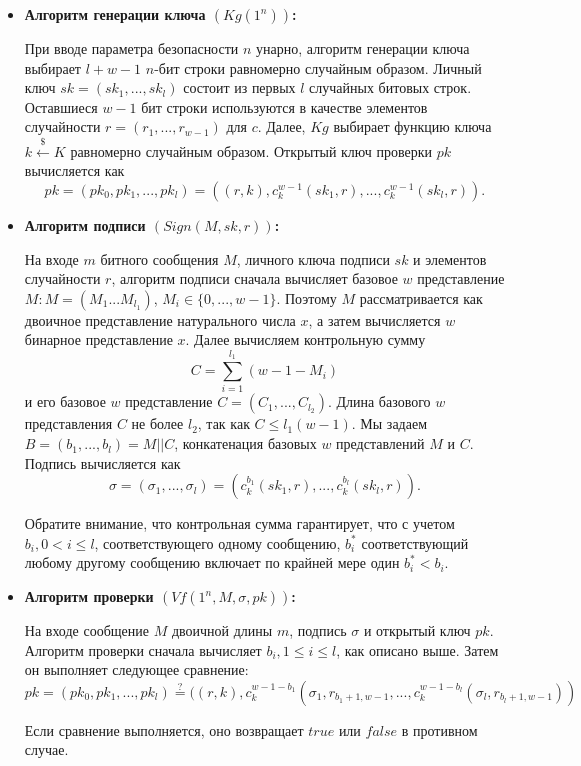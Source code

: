 \documentclass[a4paper, 14pt]{extarticle}
\begin{document}
\begin{itemize}
    \item \textbf{Алгоритм генерации ключа $(Kg(1^n))$:}

    При вводе параметра безопасности $n$ унарно, алгоритм генерации ключа выбирает $l + w - 1$ $n$-бит строки равномерно случайным образом. Личный ключ $sk = (sk_{1}, ..., sk_{l})$ состоит из первых $l$ случайных битовых строк. Оставшиеся $w - 1$ бит строки используются в качестве элементов случайности $r = (r_{1}, ..., r_{w - 1})$ для $c$. Далее, $Kg$ выбирает функцию ключа $k \stackrel{\$}\leftarrow K$ равномерно случайным образом. Открытый ключ проверки $pk$ вычисляется как
    \[ pk = (pk_{0}, pk_{1}, ..., pk_{l}) = ((r, k),c^{w - 1}_{k}(sk_{1},r), ..., c^{w - 1}_{k}(sk_{l}, r)). \]

    \item \textbf{Алгоритм подписи $(Sign(M, sk, r))$:}

    На входе $m$ битного сообщения $M$, личного ключа подписи $sk$ и элементов случайности $r$, алгоритм подписи сначала вычисляет базовое $w$ представление $M: M = (M_{1} . . . M_{l_{1}} )$, $M_{i} \in \{0, ..., w - 1\}$. Поэтому $M$ рассматривается как двоичное представление натурального числа $x$, а затем вычисляется $w$ бинарное представление $x$. Далее вычисляем контрольную сумму
    \[ C = \sum^{l_{1}}_{i = 1}(w - 1 - M_{i}) \]
    и его базовое $w$ представление $C = (C_{1}, ..., C_{l_{2}})$. Длина базового $w$ представления $C$ не более $l_{2}$, так как $C \leq l_{1}(w - 1)$. Мы задаем $B = (b_{1}, ..., b_{l}) = M || C$, конкатенация базовых $w$ представлений $M$ и $C$. Подпись вычисляется как
    \[ \sigma = (\sigma_{1}, ..., \sigma_{l}) = (c^{b_{1}}_{k}(sk_{1},r), ..., c^{b_{l}}_{k}(sk_{l},r)). \]

    Обратите внимание, что контрольная сумма гарантирует, что с учетом $b_{i}, 0 < i \leq l$, соответствующего одному сообщению, $b^{*}_{i}$ соответствующий любому другому сообщению включает по крайней мере один $b^{*}_{i} < b_{i}$.

    \item \textbf{Алгоритм проверки $(Vf(1^n, M, \sigma, pk))$:}

    На входе сообщение $M$ двоичной длины $m$, подпись $\sigma$ и открытый ключ $pk$. Алгоритм проверки сначала вычисляет $b_{i}, 1 \leq i \leq l$, как описано выше. Затем он выполняет следующее сравнение:
    \[ pk = (pk_{0}, pk_{1}, ..., pk_{l}) \stackrel{?}{=} ((r,k),c^{w - 1 - b_{1}}_{k}(\sigma_{1}, r_{b_{1} + 1, w - 1}, ..., c^{w - 1 - b_{l}}_{k}(\sigma_{l}, r_{b_{l} + 1, w - 1}))\]

    Если сравнение выполняется, оно возвращает $true$ или $false$ в противном случае.
\end{itemize}
\end{document}
